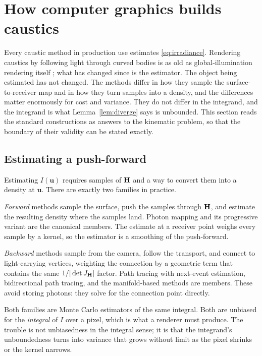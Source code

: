 \section{How computer graphics builds caustics}
\label{sec:cg}

Every caustic method in production use estimates \eqref{eq:irradiance}.
Rendering caustics by following light through curved bodies is as old as
global-illumination rendering itself \cite{mitchell1992}; what has changed since
is the estimator. The object being estimated has not changed. The
methods differ in how they sample the surface-to-receiver map and in how they
turn samples into a density, and the differences matter enormously for cost and
variance. They do not differ in the integrand, and the integrand is what
Lemma~\ref{lem:diverge} says is unbounded. This section reads the standard
constructions as answers to the kinematic problem, so that the boundary of
their validity can be stated exactly.

\subsection{Estimating a push-forward}
\label{sec:two-families}

Estimating $I(\mathbf{u})$ requires samples of $\mathbf{H}$ and a way to convert them
into a density at $\mathbf{u}$. There are exactly two families in practice.

\emph{Forward} methods sample the surface, push the samples through $\mathbf{H}$, and
estimate the resulting density where the samples land. Photon mapping
\cite{jensen1996} and its progressive variant \cite{hachisuka2008} are the
canonical members. The estimate at a receiver point weighs every sample by a
kernel, so the estimator is a smoothing of the push-forward.

\emph{Backward} methods sample from the camera, follow the transport, and
connect to light-carrying vertices, weighting the connection by a geometric
term that contains the same $1/|\det J_{\mathbf{H}}|$ factor. Path tracing with next-event
estimation, bidirectional path tracing, and the manifold-based methods
\cite{hanika2015,zeltner2020} are members. These avoid storing photons: they solve for the connection point directly.

Both families are Monte Carlo estimators of the same integral. Both are
unbiased for the \emph{integral} of $I$ over a pixel, which is what a renderer
must produce. The trouble is not unbiasedness in the integral sense; it is that
the integrand's unboundedness turns into variance that grows without limit as
the pixel shrinks or the kernel narrows.

